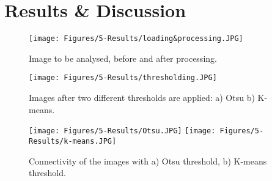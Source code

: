 \section{Results \& Discussion}

\begin{figure}[h] %
    \centering
    \texttt{[image: Figures/5-Results/loading\&processing.JPG]}
    \caption{Image to be analysed, before and after processing.}
    \label{fig:load&processing}
\end{figure}


\begin{figure}[h] %
    \centering
    \texttt{[image: Figures/5-Results/thresholding.JPG]}
    \caption{Images after two different thresholds are applied: a) Otsu b) K-means.}
    \label{fig:thresholding}
\end{figure}


\begin{figure}[h] %
    \centering
    \texttt{[image: Figures/5-Results/Otsu.JPG]}
    \texttt{[image: Figures/5-Results/k-means.JPG]}
    \caption{Connectivity of the images with a) Otsu threshold, b) K-means threshold.}
    \label{fig:connectivity}
\end{figure}

